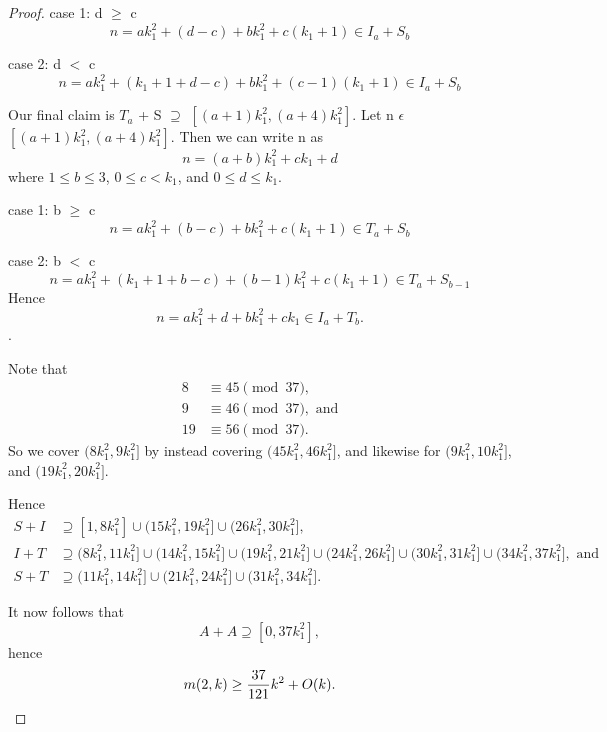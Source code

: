 \begin{proof}
case 1: d $\geq$ c
\[
n = ak_1^2 + (d - c) + bk_1^2 + c(k_1 + 1) \in I_a + S_b
\]

case 2: d $<$ c
\[
n = ak_1^2 + (k_1 + 1 + d - c) + bk_1^2 + (c - 1)(k_1 + 1) \in  I_a + S_b
\]

Our final claim is $T_a$ + S $\supseteq$ $[(a +1)k_1^2 ,  (a + 4)k_1^2]$. Let n $\epsilon$ $[(a +1)k_1^2 ,  (a + 4)k_1^2]$.
Then we can write n as 
\[
n = (a + b) k_1^2 + ck_1 + d 
\]
where $1 \leq b \leq 3$, $0 \leq c < k_1$, and $0 \leq d \leq k_1$. 

case 1: b $\geq$ c
\[
n = ak_1^2 + (b - c) + bk_1^2 + c(k_1 + 1) \in T_a + S_b
\]

case 2: b $<$ c
\[
n = ak_1^2 + (k_1 + 1 + b - c) + (b - 1)k_1^2 + c(k_1 + 1) \in  T_a + S_{b-1}
\]
Hence 
\[
n = ak_1^2 + d + bk_1^2 + ck_1 \in I_a + T_b.
\].

Note that
\begin{align*}
8 &\equiv 45\pmod{37},\\
 9 &\equiv 46\pmod{37},  \text{ and} \\
19 &\equiv 56\pmod{37 }.
\end{align*} 
So we cover $(8k_1^2, 9k_1^2]$ by instead covering $(45k_1^2, 46k_1^2]$, and likewise for $(9k_1^2, 10k_1^2]$, and $(19k_1^2, 20k_1^2]$. 

Hence 
\begin{align*}
S + I &\supseteq [1, 8k_1^2] \cup (15k_1^2, 19k_1^2] \cup (26k_1^2, 30k_1^2],\\
I + T &\supseteq (8k_1^2, 11k_1^2] \cup (14k_1^2, 15k_1^2] \cup (19k_1^2, 21k_1^2] \cup (24k_1^2, 26k_1^2] \cup (30k_1^2, 31k_1^2] \cup (34k_1^2, 37k_1^2],\text{ and}\\
S + T &\supseteq (11k_1^2, 14k_1^2] \cup (21k_1^2, 24k_1^2] \cup (31k_1^2, 34k_1^2]. 
\end{align*}

It now follows that 
\[
A + A \supseteq [0, 37k_1^2],
\]
hence
\[
m(2,k) \geq \frac{37}{121}k^2 + O(k). \qedhere
\]
\end{proof}
